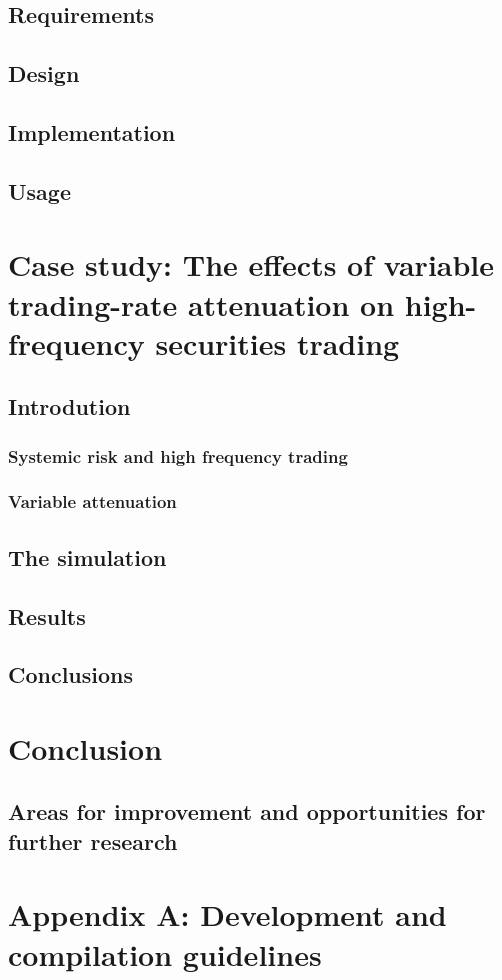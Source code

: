 \documentclass[a4paper, 11pt]{article}
\let\stdsection\section
\renewcommand\section{\newpage\stdsection}
\begin{document}
  \subsection{Requirements}
  \subsection{Design}
  \subsection{Implementation}
  \subsection{Usage}
\section{Case study: The effects of variable trading-rate attenuation on high-frequency securities trading}
  \subsection{Introdution}
    \subsubsection{Systemic risk and high frequency trading}
    \subsubsection{Variable attenuation}
  \subsection{The simulation}
  \subsection{Results}
  \subsection{Conclusions}
\section{Conclusion}
  \subsection{Areas for improvement and opportunities for further research}
\section{Appendix A: Development and compilation guidelines}
\end{document}
